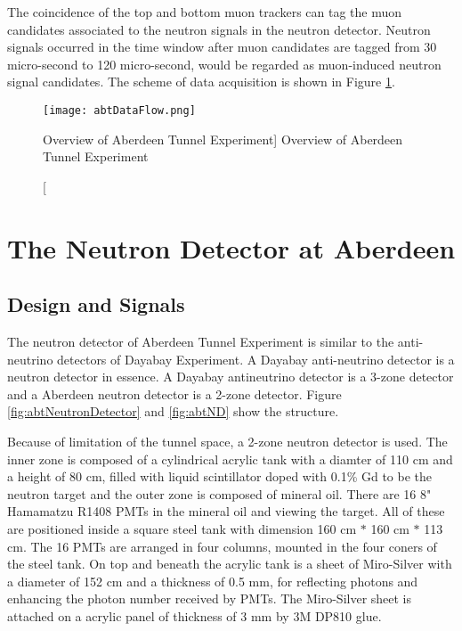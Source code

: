 The coincidence of the top and bottom muon trackers can tag the muon candidates
associated to the neutron signals in the neutron detector. Neutron signals occurred
in the time window after muon candidates are tagged from 30 micro-second to
120 micro-second, would be regarded as muon-induced neutron signal candidates.
The scheme of data acquisition is shown in Figure \ref{fig:abtDataFlow}.



\begin{figure}
    \label{fig:abtDataFlow}
    \centering
    \texttt{[image: abtDataFlow.png]}
    \caption
    [Overview of Aberdeen Tunnel Experiment]
    {Overview of Aberdeen Tunnel Experiment}
    \end{figure}


\section{The Neutron Detector at Aberdeen}
\label{sec:ND}
\subsection{Design and Signals}

The neutron detector of Aberdeen Tunnel Experiment is similar to the
anti-neutrino detectors of Dayabay Experiment. A Dayabay anti-neutrino
detector is a neutron detector in essence. A Dayabay antineutrino detector is a
3-zone detector and a Aberdeen neutron detector is a 2-zone detector.
Figure \ref{fig:abtNeutronDetector} and \ref{fig:abtND} show the structure.

Because of limitation of the tunnel space, a 2-zone neutron detector is used.
The inner zone is composed of a cylindrical acrylic tank with a diamter of 110 cm and a height of 80 cm,
filled with liquid scintillator doped with 0.1\% Gd to be the neutron target and
the outer zone is composed of mineral oil. There are 16 8" Hamamatzu R1408 PMTs in the mineral oil and viewing the target.
All of these are positioned inside a square steel tank with dimension 160 cm $*$ 160 cm $*$ 113 cm. The 16 PMTs
are arranged in four columns, mounted in the four coners of the steel tank. On top and beneath the acrylic tank is
a sheet of Miro-Silver \cite{MiroSilver} with a diameter of 152 cm and a thickness of 0.5 mm, for reflecting photons and
enhancing the photon number received by PMTs.
The Miro-Silver sheet is attached on a acrylic panel of thickness of 3 mm by 3M DP810 \cite{3M} glue.

